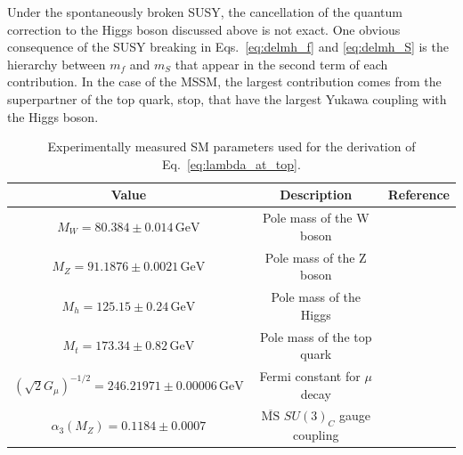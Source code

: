 \documentclass[12pt,twoside,book]{article}
\begin{document}
Under the spontaneously broken SUSY, the cancellation of the quantum correction to the Higgs boson discussed above is not exact.
One obvious consequence of the SUSY breaking in Eqs.~\eqref{eq:delmh_f} and \eqref{eq:delmh_S} is the hierarchy between $m_f$ and $m_S$ that appear in the second term of each contribution.
In the case of the MSSM, the largest contribution comes from the superpartner of the top quark, stop, that have the largest Yukawa coupling with the Higgs boson.

\begin{table}[t]
  \centering
  \begin{tabular}{ccc}
    Value & Description & Reference\\ \hline
    $M_W = 80.384 \pm 0.014\, \mathrm{GeV}$ & Pole mass of the W boson
      & \cite{Group:2012gb,Alcaraz:1016509} \\
    $M_Z = 91.1876 \pm 0.0021\, \mathrm{GeV}$ & Pole mass of the Z boson
      & \cite{Beringer:1900zz} \\
    $M_h = 125.15 \pm 0.24\, \mathrm{GeV}$ & Pole mass of the Higgs
      & \cite{Aad:2013wqa,Chatrchyan:2013mxa} \\
    $M_t = 173.34 \pm 0.82\, \mathrm{GeV}$ & Pole mass of the top quark
      & \cite{ATLAS:2014wva} \\
    $\left( \sqrt{2} G_\mu \right)^{-1/2} = 246.21971 \pm 0.00006\, \mathrm{GeV}$
      & Fermi constant for $\mu$ decay & \cite{Tishchenko:2012ie} \\
    $\alpha_3 (M_Z) = 0.1184 \pm 0.0007$
      & $\overline{\mathrm{MS}}$ $SU(3)_C$ gauge coupling & \cite{Bethke:2012jm}
  \end{tabular}
  \caption{Experimentally measured SM parameters used for the derivation of Eq.~\eqref{eq:lambda_at_top}.}
  \label{tab:SM_param}
\end{table}
\end{document}
